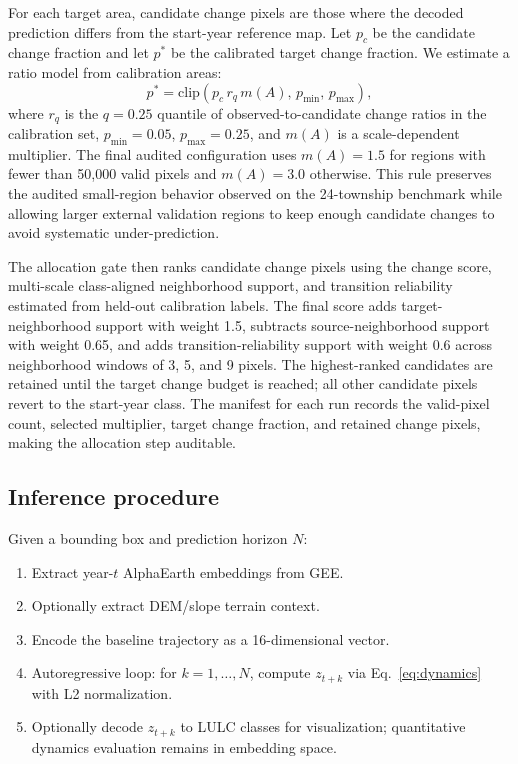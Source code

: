 \documentclass{article}
\begin{document}
For each target area, candidate change pixels are those where the decoded prediction differs from the start-year reference map. Let $p_c$ be the candidate change fraction and let $p^\ast$ be the calibrated target change fraction. We estimate a ratio model from calibration areas:
\begin{equation}
p^\ast = \mathrm{clip}\left(p_c \, r_q \, m(A),\, p_{\min},\, p_{\max}\right),
\end{equation}
where $r_q$ is the $q=0.25$ quantile of observed-to-candidate change ratios in the calibration set, $p_{\min}=0.05$, $p_{\max}=0.25$, and $m(A)$ is a scale-dependent multiplier. The final audited configuration uses $m(A)=1.5$ for regions with fewer than 50{,}000 valid pixels and $m(A)=3.0$ otherwise. This rule preserves the audited small-region behavior observed on the 24-township benchmark while allowing larger external validation regions to keep enough candidate changes to avoid systematic under-prediction.

The allocation gate then ranks candidate change pixels using the change score, multi-scale class-aligned neighborhood support, and transition reliability estimated from held-out calibration labels. The final score adds target-neighborhood support with weight 1.5, subtracts source-neighborhood support with weight 0.65, and adds transition-reliability support with weight 0.6 across neighborhood windows of 3, 5, and 9 pixels. The highest-ranked candidates are retained until the target change budget is reached; all other candidate pixels revert to the start-year class. The manifest for each run records the valid-pixel count, selected multiplier, target change fraction, and retained change pixels, making the allocation step auditable.

\subsection{Inference procedure}

Given a bounding box and prediction horizon $N$:
\begin{enumerate}
\item Extract year-$t$ AlphaEarth embeddings from GEE.
\item Optionally extract DEM/slope terrain context.
\item Encode the baseline trajectory as a 16-dimensional vector.
\item Autoregressive loop: for $k = 1, \ldots, N$, compute $z_{t+k}$ via Eq.~\ref{eq:dynamics} with L2 normalization.
\item Optionally decode $z_{t+k}$ to LULC classes for visualization; quantitative dynamics evaluation remains in embedding space.
\end{enumerate}
\end{document}
